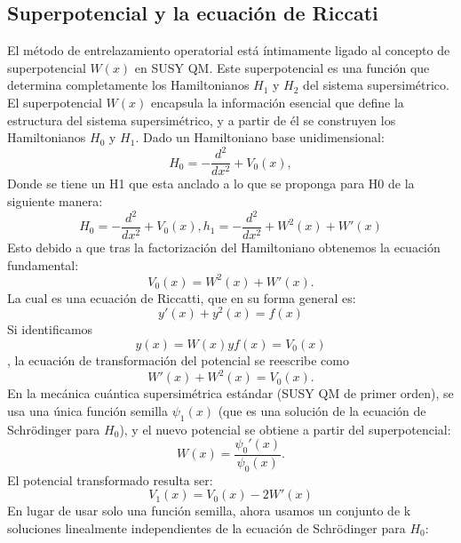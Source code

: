 \documentclass[%
 aip,
 jmp,%
 amsmath,amssymb,
 reprint,
]{revtex4-2}
\begin{document}
\subsection{Superpotencial y la ecuación de Riccati}
El método de entrelazamiento operatorial está íntimamente ligado al concepto de superpotencial \( W(x) \) en SUSY QM. Este superpotencial es una función que determina completamente los Hamiltonianos \( H_1 \) y \( H_2 \) del sistema supersimétrico. 
El superpotencial \( W(x) \) encapsula la información esencial que define la estructura del sistema supersimétrico, y a partir de él se construyen los Hamiltonianos \( H_0 \) y \( H_1 \).
Dado un Hamiltoniano base unidimensional:
\begin{equation}
H_0 = -\frac{d^2}{dx^2} + V_0(x),
\end{equation}
Donde se tiene un H1 que esta anclado a lo que se proponga para H0 de la siguiente manera:
\begin{equation}
H_0 = -\frac{d^2}{dx^2} + V_0(x),
h_1 = -\frac{d^2}{dx^2} + W^2(x) + W'(x)
\end{equation}
Esto debido a que tras la factorización del Hamiltoniano obtenemos la ecuación fundamental: 
\begin{equation}
V_0(x) = W^2(x) + W'(x).
\end{equation}
La cual es una ecuación de Riccatti, que en su forma general es: 
\begin{equation}
y'(x) + y^2(x) = f(x)
\end{equation}
Si identificamos
\begin{equation}
y(x) = W(x) y f(x) = V_0(x)
\end{equation}
, la ecuación de transformación del potencial se reescribe como
\begin{equation}
W'(x) + W^2(x) = V_0(x).
\end{equation}
En la mecánica cuántica supersimétrica estándar (SUSY QM de primer orden), se usa una única función semilla \( \psi_1(x) \) (que es una solución de la ecuación de Schrödinger para \( H_0 \)), y el nuevo potencial se obtiene a partir del superpotencial:
\begin{equation}
W(x) = \frac{\psi_0'(x)}{\psi_0(x)}.
\end{equation}
El potencial transformado resulta ser:
\begin{equation}
V_1(x) = V_0(x) - 2W'(x)
\end{equation}
En lugar de usar solo una función semilla, ahora usamos un conjunto de k soluciones linealmente independientes de la ecuación de Schrödinger para \( H_0 \):
\end{document}
